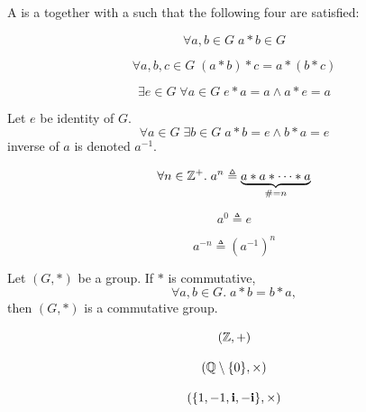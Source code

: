 
\begin{frame}
  \begin{definition}[Group (群)]
    A  is a 
    together with a 
    such that the following four  are satisfied:

    \pause
    \vspace{0.30cm}
    \begin{description}[<+->][Associativity:]
      \item[Closure (封闭):]
        \[
          \forall a, b \in G\; a \ast b \in G
        \]
      \item[Associativity (结合律):]
        \[
          \forall a, b, c \in G\; (a \ast b) \ast c = a \ast (b \ast c)
        \]
      \item[Identity (单位元):]
        \[
          \exists e \in G\; \forall a \in G\; e \ast a = a \land a \ast e = a
        \]
      \item[Inverse (逆元):] Let $e$ be  identity of $G$.
        \[
          \forall a \in G\; \exists b \in G\; a \ast b = e \land b \ast a = e
        \]
         inverse of $a$ is denoted $a^{-1}$.
    \end{description}
  \end{definition}
\end{frame}

\begin{frame}
  \[
    \forall n \in \mathbb{Z}^{+}.\; a^{n} \triangleq \underbrace{a \ast a \ast \dots \ast a}_{\# = n}
  \]

  \[
    a^{0} \triangleq e
  \]

  \[
    a^{-n} \triangleq (a^{-1})^{n}
  \]
\end{frame}

\begin{frame}
  \begin{definition}
    Let $(G, \ast)$ be a group. If $\ast$ is commutative,
    \[
      \forall a, b \in G.\; a \ast b = b \ast a,
    \]
    then $(G, \ast)$ is a commutative group.
  \end{definition}
\end{frame}

\begin{frame}{}
    \[
      (\mathbb{Z}, +)
    \]

    \pause
    \[
      (\mathbb{Q} \setminus \{0\}, \times)
    \]

    \pause
    \[
      (\{1, -1, \text{\bf i}, -\text{\bf i}\}, \times)
    \]
\end{frame}

